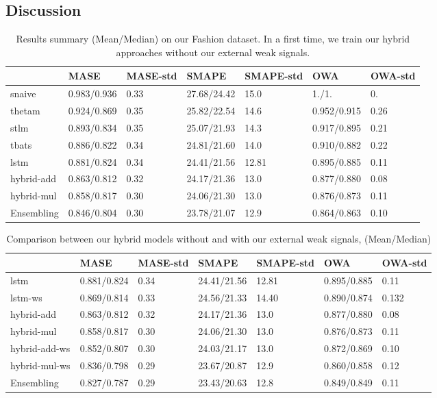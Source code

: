 \documentclass{article} %
\begin{document}
\subsection{Discussion}

\begin{table}
  \caption{Results summary (Mean/Median) on our Fashion dataset. In a first time, we train our hybrid approaches without our external weak signals.}
  \label{sample-table}
  \centering
  \begin{tabular}{lllllll}
    \hline
    &  MASE  & MASE-std & SMAPE & SMAPE-std & OWA & OWA-std  \\
    \hline
     snaive & 0.983/0.936 & 0.33 & 27.68/24.42 & 15.0 & 1./1. & 0.\\
     thetam & 0.924/0.869  & 0.35 & 25.82/22.54  & 14.6 & 0.952/0.915 & 0.26\\
     stlm & 0.893/0.834 & 0.35 & 25.07/21.93  & 14.3 & 0.917/0.895 & 0.21\\
     tbats & 0.886/0.822  & 0.34 &  24.81/21.60 & 14.0 &  0.910/0.882 & 0.22 \\
     lstm & 0.881/0.824 & 0.34 & 24.41/21.56 & 12.81 & 0.895/0.885 & 0.11 \\
     hybrid-add & 0.863/0.812  & 0.32 & 24.17/21.36 & 13.0 & 0.877/0.880 & 0.08 \\
     hybrid-mul & 0.858/0.817 & 0.30 & 24.06/21.30 & 13.0 & 0.876/0.873 & 0.11 \\
     Ensembling & 0.846/0.804 & 0.30 & 23.78/21.07 & 12.9 & 0.864/0.863 & 0.10  \\
    \hline
  \end{tabular}
\end{table}

\begin{table}
  \caption{Comparison between our hybrid models without and with our external weak signals, (Mean/Median)}
  \label{sample-table}
  \centering
  \begin{tabular}{lllllll}
    \hline
    &  MASE  & MASE-std & SMAPE & SMAPE-std & OWA & OWA-std \\
    \hline
    lstm & 0.881/0.824 & 0.34 & 24.41/21.56 & 12.81 & 0.895/0.885 & 0.11 \\
    lstm-ws & 0.869/0.814 & 0.33 & 24.56/21.33 & 14.40 & 0.890/0.874 & 0.132 \\
     hybrid-add & 0.863/0.812  & 0.32 & 24.17/21.36 & 13.0 & 0.877/0.880 & 0.08 \\
     hybrid-mul & 0.858/0.817 & 0.30 & 24.06/21.30 & 13.0 & 0.876/0.873 & 0.11 \\
     hybrid-add-ws & 0.852/0.807 & 0.30 & 24.03/21.17 & 13.0 & 0.872/0.869 & 0.10 \\
     hybrid-mul-ws & 0.836/0.798 & 0.29 & 23.67/20.87 & 12.9 & 0.860/0.858 & 0.12 \\
     Ensembling & 0.827/0.787 & 0.29 & 23.43/20.63 & 12.8 & 0.849/0.849 & 0.11\\
    \hline
  \end{tabular}
\end{table}
\end{document}
